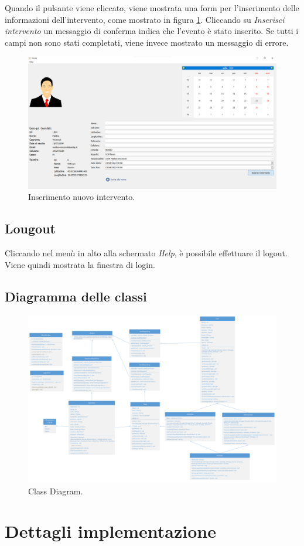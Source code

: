 Quando il pulsante viene cliccato, viene mostrata una form per l'inserimento delle informazioni dell'intervento, come mostrato in figura \ref{fig:new_op}. Cliccando su \textit{Inserisci intervento} un messaggio di conferma indica che l'evento è stato inserito. Se tutti i campi non sono stati completati, viene invece mostrato un messaggio di errore.

\begin{figure}[h!]
	\centering
	\includegraphics[width=1\linewidth]{./ImageFiles/new_op.png}
	\caption{Inserimento nuovo intervento.}
	\label{fig:new_op}
\end{figure}

\subsection{Lougout}
Cliccando nel menù in alto alla schermato \textit{Help}, è possibile effettuare il logout. Viene quindi mostrata la finestra di login.

\begin{landscape}
	\section{Diagramma delle classi}
	\begin{figure}[h!]
		\centering
		\includegraphics[width=0.9\linewidth]{./OtherFiles/Class Diagram}
		\caption{Class Diagram.}
		\label{fig:class_diagram}
	\end{figure}
\end{landscape}

\section{Dettagli implementazione}




